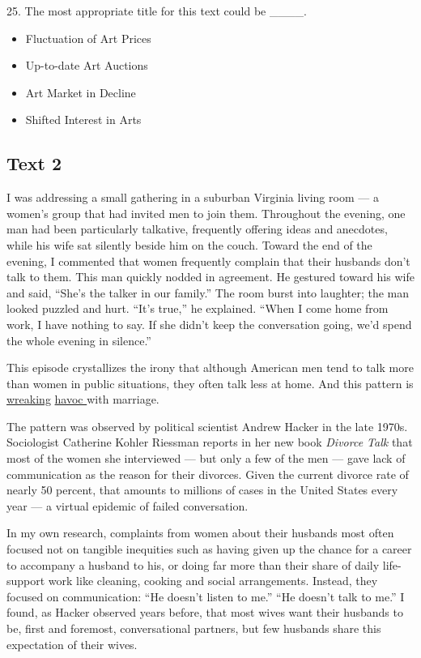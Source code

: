 \documentclass[UTF8,11pt]{ctexart}
\begin{document}
25. The most appropriate title for this text could be \_\_\_\_.


\begin{itemize}[leftmargin=2em,itemsep=.2em,topsep=.4em]\item[A.] Fluctuation of Art Prices
\item[B.] Up-to-date Art Auctions
\item[C.] Art Market in Decline
\item[D.] Shifted Interest in Arts
\end{itemize}

\subsection*{\textbf{Text 2}}


I was addressing a small gathering in a suburban Virginia living room — a women’s group that had invited men to join them. Throughout the evening, one man had been particularly talkative, frequently offering ideas and anecdotes, while his wife sat silently beside him on the couch. Toward the end of the evening, I commented that women frequently complain that their husbands don’t talk to them. This man quickly nodded in agreement. He gestured toward his wife and said, “She’s the talker in our family.” The room burst into laughter; the man looked puzzled and hurt. “It’s true,” he explained. “When I come home from work, I have nothing to say. If she didn’t keep the conversation going, we’d spend the whole evening in silence.”


This episode crystallizes the irony that although American men tend to talk more than women in public situations, they often talk less at home. And this pattern is \uline{wreaking} \uline{havoc }with marriage.


The pattern was observed by political scientist Andrew Hacker in the late 1970s. Sociologist Catherine Kohler Riessman reports in her new book \textit{Divorce Talk} that most of the women she interviewed — but only a few of the men — gave lack of communication as the reason for their divorces. Given the current divorce rate of nearly 50 percent, that amounts to millions of cases in the United States every year — a virtual epidemic of failed conversation.


In my own research, complaints from women about their husbands most often focused not on tangible inequities such as having given up the chance for a career to accompany a husband to his, or doing far more than their share of daily life-support work like cleaning, cooking and social arrangements. Instead, they focused on communication: “He doesn’t listen to me.” “He doesn’t talk to me.” I found, as Hacker observed years before, that most wives want their husbands to be, first and foremost, conversational partners, but few husbands share this expectation of their wives.
\end{document}
